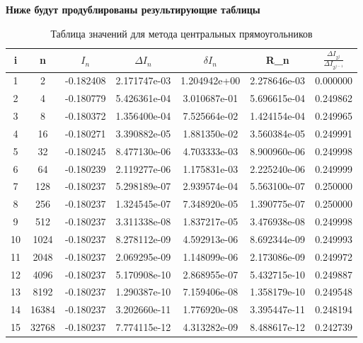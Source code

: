 \documentclass{article}
\begin{document}
 \textbf{\large{Ниже будут продублированы результирующие таблицы}} \\
 

 \begin{table}[H]
\centering
\begin{tabular}{|c|c|c|c|c|c|c|}
\hline
i & n & $I_n$ & $\Delta I_n$ & $\delta I_n$ & R_n & $\frac{\Delta I_{2^j}}{\Delta I_{2^{j - 1}}}$ \\
\hline
1 & 2 & -0.182408 & 2.171747e-03  & 1.204942e+00 & 2.278646e-03 & 0.000000 \\
2 & 4 & -0.180779 & 5.426361e-04 & 3.010687e-01 & 5.696615e-04 & 0.249862 \\
3 & 8 & -0.180372 & 1.356400e-04  & 7.525664e-02 & 1.424154e-04 & 0.249965 \\
4 & 16 & -0.180271 & 3.390882e-05  & 1.881350e-02 & 3.560384e-05 & 0.249991 \\
5 & 32 & -0.180245 & 8.477130e-06  & 4.703333e-03 & 8.900960e-06 & 0.249998 \\
6 & 64 & -0.180239 & 2.119277e-06  & 1.175831e-03 & 2.225240e-06 & 0.249999 \\
7 & 128 & -0.180237 & 5.298189e-07  & 2.939574e-04 & 5.563100e-07 & 0.250000 \\
8 & 256 & -0.180237 & 1.324545e-07 & 7.348920e-05 & 1.390775e-07 & 0.250000 \\
9 & 512 & -0.180237 & 3.311338e-08 & 1.837217e-05 & 3.476938e-08 & 0.249998 \\
10 & 1024 & -0.180237 & 8.278112e-09  & 4.592913e-06 & 8.692344e-09 & 0.249993 \\
11 & 2048 & -0.180237 & 2.069295e-09  & 1.148099e-06 & 2.173086e-09 & 0.249972 \\
12 & 4096 & -0.180237 & 5.170908e-10  & 2.868955e-07 & 5.432715e-10 & 0.249887 \\
13 & 8192 & -0.180237 & 1.290387e-10 & 7.159406e-08 & 1.358179e-10 & 0.249548 \\
14 & 16384 & -0.180237 & 3.202660e-11  & 1.776920e-08 & 3.395447e-11 & 0.248194 \\
15 & 32768 & -0.180237 & 7.774115e-12 & 4.313282e-09 & 8.488617e-12 & 0.242739 \\
\hline
\end{tabular}
\caption{Таблица значений для метода центральных прямоугольников}
\label{tab:my_label}
\end{table}
\end{document}
